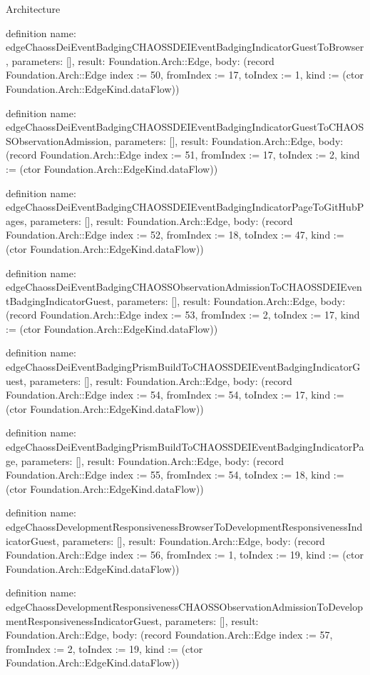 \begin{lexlean}{Architecture}
\begin{semanticmodule}
definition{
  name: edgeChaossDeiEventBadgingCHAOSSDEIEventBadgingIndicatorGuestToBrowser,
  parameters: [],
  result: Foundation.Arch::Edge,
  body: (record Foundation.Arch::Edge {index := 50, fromIndex := 17, toIndex := 1, kind := (ctor Foundation.Arch::EdgeKind.dataFlow)})
}

definition{
  name: edgeChaossDeiEventBadgingCHAOSSDEIEventBadgingIndicatorGuestToCHAOSSObservationAdmission,
  parameters: [],
  result: Foundation.Arch::Edge,
  body: (record Foundation.Arch::Edge {index := 51, fromIndex := 17, toIndex := 2, kind := (ctor Foundation.Arch::EdgeKind.dataFlow)})
}

definition{
  name: edgeChaossDeiEventBadgingCHAOSSDEIEventBadgingIndicatorPageToGitHubPages,
  parameters: [],
  result: Foundation.Arch::Edge,
  body: (record Foundation.Arch::Edge {index := 52, fromIndex := 18, toIndex := 47, kind := (ctor Foundation.Arch::EdgeKind.dataFlow)})
}

definition{
  name: edgeChaossDeiEventBadgingCHAOSSObservationAdmissionToCHAOSSDEIEventBadgingIndicatorGuest,
  parameters: [],
  result: Foundation.Arch::Edge,
  body: (record Foundation.Arch::Edge {index := 53, fromIndex := 2, toIndex := 17, kind := (ctor Foundation.Arch::EdgeKind.dataFlow)})
}

definition{
  name: edgeChaossDeiEventBadgingPrismBuildToCHAOSSDEIEventBadgingIndicatorGuest,
  parameters: [],
  result: Foundation.Arch::Edge,
  body: (record Foundation.Arch::Edge {index := 54, fromIndex := 54, toIndex := 17, kind := (ctor Foundation.Arch::EdgeKind.dataFlow)})
}

definition{
  name: edgeChaossDeiEventBadgingPrismBuildToCHAOSSDEIEventBadgingIndicatorPage,
  parameters: [],
  result: Foundation.Arch::Edge,
  body: (record Foundation.Arch::Edge {index := 55, fromIndex := 54, toIndex := 18, kind := (ctor Foundation.Arch::EdgeKind.dataFlow)})
}

definition{
  name: edgeChaossDevelopmentResponsivenessBrowserToDevelopmentResponsivenessIndicatorGuest,
  parameters: [],
  result: Foundation.Arch::Edge,
  body: (record Foundation.Arch::Edge {index := 56, fromIndex := 1, toIndex := 19, kind := (ctor Foundation.Arch::EdgeKind.dataFlow)})
}

definition{
  name: edgeChaossDevelopmentResponsivenessCHAOSSObservationAdmissionToDevelopmentResponsivenessIndicatorGuest,
  parameters: [],
  result: Foundation.Arch::Edge,
  body: (record Foundation.Arch::Edge {index := 57, fromIndex := 2, toIndex := 19, kind := (ctor Foundation.Arch::EdgeKind.dataFlow)})
}


\end{semanticmodule}
\end{lexlean}
